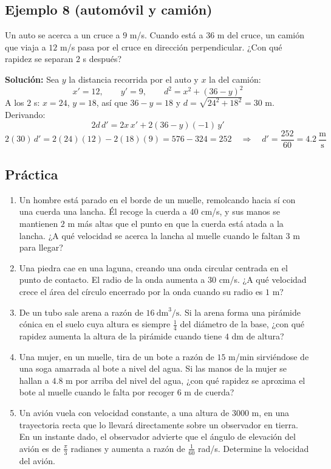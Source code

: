\documentclass[12pt]{article}
\begin{document}
\subsection{Ejemplo 8 (automóvil y camión)}
Un auto se acerca a un cruce a $9$ m/s. Cuando está a $36$ m del cruce, un camión que viaja a $12$ m/s pasa por el cruce en dirección perpendicular. ¿Con qué rapidez se separan $2$ s después?

\textbf{Solución:} Sea $y$ la distancia recorrida por el auto y $x$ la del camión:
\[
x' = 12, \qquad y' = 9, \qquad d^2 = x^2 + (36 - y)^2
\]
A los $2$ s: $x = 24$, $y = 18$, así que $36 - y = 18$ y $d = \sqrt{24^2 + 18^2} = 30$ m. Derivando:
\[
2d\,d' = 2x\,x' + 2(36 - y)(-1)\,y'
\]
\[
2(30)\,d' = 2(24)(12) - 2(18)(9) = 576 - 324 = 252 \quad \Rightarrow \quad d' = \frac{252}{60} = 4.2\ \frac{\text{m}}{\text{s}}
\]

\subsection{Práctica}
\begin{enumerate}
    \item Un hombre está parado en el borde de un muelle, remolcando hacia sí con una cuerda una lancha. Él recoge la cuerda a $40$ cm/s, y sus manos se mantienen $2$ m más altas que el punto en que la cuerda está atada a la lancha. ¿A qué velocidad se acerca la lancha al muelle cuando le faltan $3$ m para llegar?
    \item Una piedra cae en una laguna, creando una onda circular centrada en el punto de contacto. El radio de la onda aumenta a $30$ cm/s. ¿A qué velocidad crece el área del círculo encerrado por la onda cuando su radio es $1$ m?
    \item De un tubo sale arena a razón de $16\ \text{dm}^3/\text{s}$. Si la arena forma una pirámide cónica en el suelo cuya altura es siempre $\frac{1}{4}$ del diámetro de la base, ¿con qué rapidez aumenta la altura de la pirámide cuando tiene $4$ dm de altura?
    \item Una mujer, en un muelle, tira de un bote a razón de $15$ m/min sirviéndose de una soga amarrada al bote a nivel del agua. Si las manos de la mujer se hallan a $4.8$ m por arriba del nivel del agua, ¿con qué rapidez se aproxima el bote al muelle cuando le falta por recoger $6$ m de cuerda?
    \item Un avión vuela con velocidad constante, a una altura de $3000$ m, en una trayectoria recta que lo llevará directamente sobre un observador en tierra. En un instante dado, el observador advierte que el ángulo de elevación del avión es de $\frac{\pi}{3}$ radianes y aumenta a razón de $\frac{1}{60}$ rad/s. Determine la velocidad del avión.
\end{enumerate}
\end{document}
